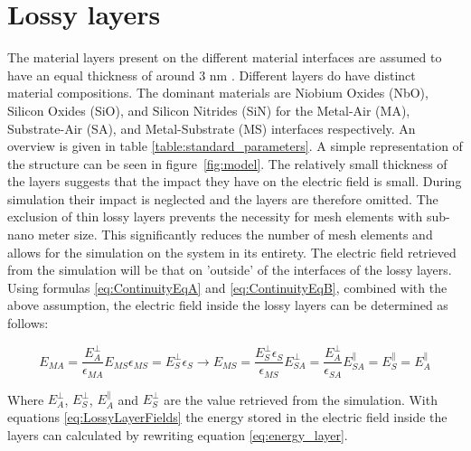 \section{Lossy layers}
The material layers present on the different material interfaces are assumed to have an equal thickness of around 3 nm \cite{Wenner2011}. Different layers do have distinct material compositions. The dominant materials are Niobium Oxides (NbO), Silicon Oxides (SiO), and Silicon Nitrides (SiN) for the Metal-Air (MA), Substrate-Air (SA), and Metal-Substrate (MS) interfaces respectively. An overview is given in table \ref{table:standard_parameters}.  A simple representation of the structure can be seen in figure~\ref{fig:model}.
The relatively small thickness of the layers suggests that the impact they have on the electric field is small. During simulation their impact is neglected and the layers are therefore omitted. The exclusion of thin lossy layers prevents the necessity for mesh elements with sub-nano meter size. This significantly reduces the number of mesh elements and allows for the simulation on the system in its entirety.
The electric field retrieved from the simulation will be that on 'outside' of the interfaces of the lossy layers. Using formulas \eqref{eq:ContinuityEqA} and \eqref{eq:ContinuityEqB}, combined with the above assumption, the electric field inside the lossy layers can be determined as follows:

\begin{subequations}\label{eq:LossyLayerFields}
	\begin{equation} \label{eq:LossyLayerFieldsA}
	E_{MA} =\frac{ E_{A}^{\bot}}{\epsilon_{MA}}
	\end{equation}	
	\begin{equation} \label{eq:LossyLayerFieldsB}
	E_{MS}\epsilon_{MS}=E_{S}^{\bot}\epsilon_{S} \rightarrow E_{MS}= \frac{E_{S}^{\bot}\epsilon_{S}}{\epsilon_{MS}}
	\end{equation}
	\begin{equation}\label{eq:LossyLayerFieldsC}
	E_{SA}^{\bot}=\frac{E_{A}^{\bot}}{\epsilon_{SA}}
	\end{equation}
	\begin{equation}\label{eq:LossyLayerFieldsD}
	E_{SA}^{\parallel}=E_{S}^{\parallel}=E_{A}^{\parallel}
	\end{equation}
\end{subequations}

Where \(E_{A}^{\bot}\), \(E_{S}^{\bot}\), \(E_{A}^{\parallel}\) and \(E_{S}^{\bot}\) are the value retrieved from the simulation. With equations \eqref{eq:LossyLayerFields} the energy stored in the electric field inside the layers can calculated by rewriting equation \eqref{eq:energy_layer}.

